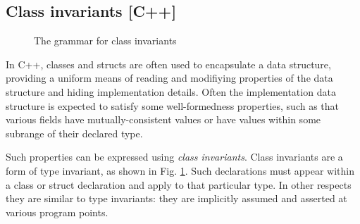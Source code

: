 \subsection{Class invariants [C++]}

\begin{figure}[t]
\begin{cadre}

\end{cadre}
\caption{The grammar for class invariants}
\label{fig:gram:classinvariant}
\end{figure}

In C++, classes and structs are often used to encapsulate a data structure, 
providing a uniform means of reading and modifiying properties of the data
structure and hiding implementation details. Often the implementation
data structure is expected to satisfy some well-formedness properties, such as
that various fields have mutually-consistent values or have values within
some subrange of their declared type.

Such properties can be expressed using \textit{class invariants}. Class invariants
are a form of type invariant, as shown in Fig. \ref{fig:gram:classinvariant}.
Such declarations must appear within a class or struct declaration and 
apply to that particular type. In other respects they are similar to 
type invariants: they are implicitly assumed and asserted at various
program points.
